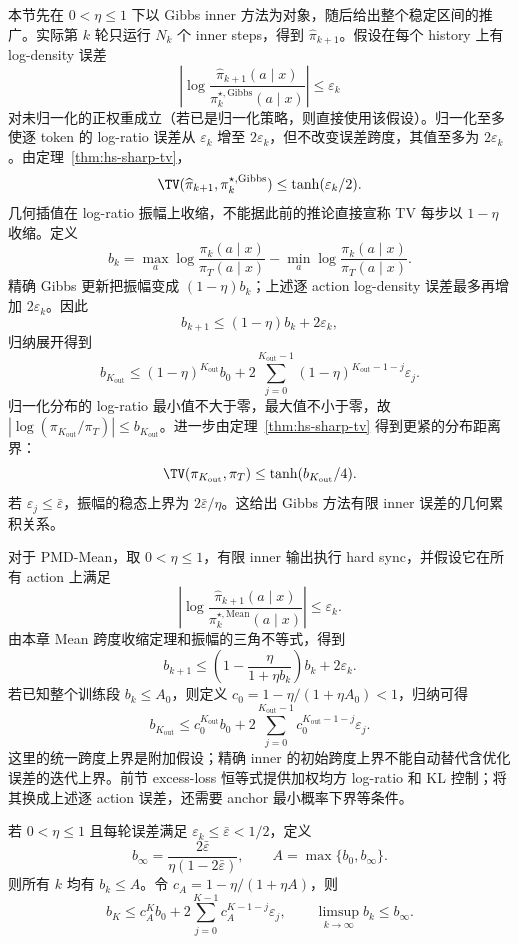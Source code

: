 本节先在 $0<\eta\leq1$ 下以 Gibbs inner 方法为对象，随后给出整个稳定区间的推广。实际第 $k$ 轮只运行 $N_k$ 个 inner steps，得到 $\widehat\pi_{k+1}$。假设在每个 history 上有 log-density 误差
\[
 \left|\log\frac{\widehat\pi_{k+1}(a\mid x)}{\pi_k^{\star,\mathrm{Gibbs}}(a\mid x)}\right|\leq\varepsilon_k
\]
对未归一化的正权重成立（若已是归一化策略，则直接使用该假设）。归一化至多使逐 token 的 log-ratio 误差从 $\varepsilon_k$ 增至 $2\varepsilon_k$，但不改变误差跨度，其值至多为 $2\varepsilon_k$。由定理~\ref{thm:hs-sharp-tv}，
\begin{equation}\label{eq:finite-inner-tv}
 \TV(\widehat\pi_{k+1},\pi_k^{\star,\mathrm{Gibbs}})
 \leq \tanh(\varepsilon_k/2).
\end{equation}
几何插值在 log-ratio 振幅上收缩，不能据此前的推论直接宣称 TV 每步以 $1-\eta$ 收缩。定义
\[
b_k=\max_a\log\frac{\pi_k(a\mid x)}{\pi_T(a\mid x)}
-\min_a\log\frac{\pi_k(a\mid x)}{\pi_T(a\mid x)}.
\]
精确 Gibbs 更新把振幅变成 $(1-\eta)b_k$；上述逐 action log-density 误差最多再增加 $2\varepsilon_k$。因此
\begin{equation}\label{eq:outer-error-recursion}
b_{k+1}\le(1-\eta)b_k+2\varepsilon_k,
\end{equation}
归纳展开得到
\[
b_{K_{\mathrm{out}}}\le(1-\eta)^{K_{\mathrm{out}}} b_0
+2\sum_{j=0}^{K_{\mathrm{out}}-1}(1-\eta)^{K_{\mathrm{out}}-1-j}\varepsilon_j.
\]
归一化分布的 log-ratio 最小值不大于零，最大值不小于零，故 $|\log(\pi_{K_{\mathrm{out}}}/\pi_T)|\le b_{K_{\mathrm{out}}}$。进一步由定理~\ref{thm:hs-sharp-tv} 得到更紧的分布距离界：
\[
\TV(\pi_{K_{\mathrm{out}}},\pi_T)\le\tanh(b_{K_{\mathrm{out}}}/4).
\]
若 $\varepsilon_j\le\bar\varepsilon$，振幅的稳态上界为 $2\bar\varepsilon/\eta$。这给出 Gibbs 方法有限 inner 误差的几何累积关系。

对于 PMD-Mean，取 $0<\eta\le1$，有限 inner 输出执行 hard sync，并假设它在所有 action 上满足
\[
\left|\log\frac{\widehat\pi_{k+1}(a\mid x)}
{\pi_k^{\star,\mathrm{Mean}}(a\mid x)}\right|\le\varepsilon_k.
\]
由本章 Mean 跨度收缩定理和振幅的三角不等式，得到
\[
b_{k+1}\le\left(1-\frac{\eta}{1+\eta b_k}\right)b_k+2\varepsilon_k.
\]
若已知整个训练段 $b_k\le A_0$，则定义
$c_0=1-\eta/(1+\eta A_0)<1$，归纳可得
\[
b_{K_{\mathrm{out}}}\le c_0^{K_{\mathrm{out}}}b_0
+2\sum_{j=0}^{K_{\mathrm{out}}-1}c_0^{K_{\mathrm{out}}-1-j}\varepsilon_j.
\]
这里的统一跨度上界是附加假设；精确 inner 的初始跨度上界不能自动替代含优化误差的迭代上界。前节 excess-loss 恒等式提供加权均方 log-ratio 和 KL 控制；将其换成上述逐 action 误差，还需要 anchor 最小概率下界等条件。

\begin{theorem}
若 $0<\eta\leq1$ 且每轮误差满足 $\varepsilon_k\leq\bar\varepsilon<1/2$，定义
\[
 b_\infty=\frac{2\bar\varepsilon}{\eta(1-2\bar\varepsilon)},\qquad
 A=\max\{b_0,b_\infty\}.
\]
则所有 $k$ 均有 $b_k\leq A$。令 $c_A=1-\eta/(1+\eta A)$，则
\[
 b_K\leq c_A^K b_0+
     2\sum_{j=0}^{K-1}c_A^{K-1-j}\varepsilon_j,
 \qquad \limsup_{k\to\infty}b_k\leq b_\infty.
\]
\end{theorem}

